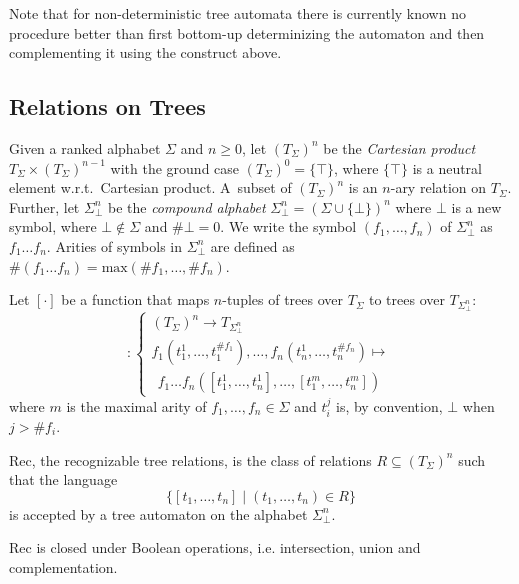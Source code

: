 Note that for non-deterministic tree automata there is currently known no
procedure better than first bottom-up determinizing the automaton and then
complementing it using the construct above.

 \subsection{Relations on Trees}

Given a ranked alphabet $\Sigma$ and $n \geq 0$, let $(T_\Sigma)^n$ be the
\emph{Cartesian product} $T_\Sigma \times (T_\Sigma)^{n-1}$ with the ground case
$(T_\Sigma)^0 = \{\top\}$, where $\{\top\}$ is a neutral element w.r.t.\ 
Cartesian product. A~subset of $(T_\Sigma)^n$ is an $n$-ary relation on
$T_\Sigma$. Further, let $\Sigma^n_\bot$ be the \emph{compound alphabet}
$\Sigma_\bot^n = (\Sigma \cup \{\bot\})^n$ where $\bot$ is a new symbol, where
$\bot \notin \Sigma$ and $\#\bot = 0$. We write the symbol
$(f_1,\ldots,f_n)$ of $\Sigma_\bot^n$ as $f_1\ldots f_n$. Arities of symbols in
$\Sigma_\bot^n$ are defined as $\#(f_1\ldots f_n) =
\text{max}(\#f_1,\ldots,\#f_n)$.

Let $[\cdot]$ be a function that maps $n$-tuples of trees over $T_\Sigma$ to
trees over $T_{\Sigma_\bot^n}$:
\begin{equation}
    [\cdot] :
    \begin{cases}
     (T_\Sigma)^n \rightarrow T_{\Sigma^n_\bot}\\
		 f_1(t_1^1,\ldots,t^{\#f_1}_1),\ldots,f_n(t_n^1,\ldots,t^{\#f_n}_n) \mapsto\\
		 \ \ f_1\ldots f_n([t_1^1,\ldots,t_n^1],\ldots,[t_1^m,\ldots,t_n^m])
   \end{cases}
\end{equation}
 where $m$ is the maximal arity of $f_1,\ldots,f_n \in \Sigma$ and $t_i^j$ is,
 by convention, $\bot$ when $j > \#f_i$.

\begin{defz}
Rec, the recognizable tree relations, is the class of relations $R \subseteq
(T_\Sigma)^n$ such that the language 
\begin{equation}
\{[t_1,\ldots,t_n] \mid (t_1,\ldots,t_n)
\in R\}
\end{equation} is accepted by a tree automaton on the alphabet $\Sigma_\bot^n$.
\end{defz}

\begin{prop}
Rec is closed under Boolean operations, i.e. intersection, union and
complementation.
\end{prop}


